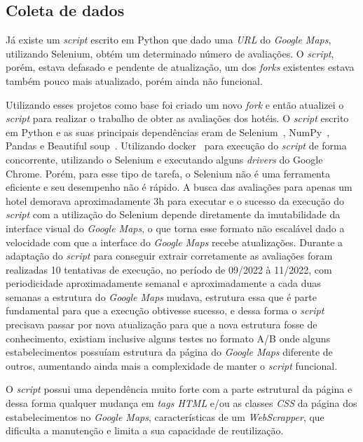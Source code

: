 \subsection{Coleta de dados}
\label{cap:metodologia:sec:conjunto_dados:sec:coleta_review}

Já existe um \emph{script} escrito em Python \cite{gaspa93scrapper2023} que dado uma \emph{URL} do \textit{Google Maps}, utilizando Selenium, obtém um determinado número de avaliações. O \emph{script}, porém, estava defasado e pendente de atualização, um dos \emph{forks} existentes  estava também pouco mais atualizado, porém ainda não funcional.

Utilizando esses projetos como base foi criado um novo \emph{fork} e então atualizei o \emph{script} para realizar o trabalho de obter as avaliações dos hotéis. O \emph{script} escrito em Python e as suas principais dependências eram de Selenium~\cite{selenium2023}, NumPy~\cite{harris2020array}, Pandas\cite{jeffreback20226702671} e Beautiful soup~\cite{richardson2007beautiful}. Utilizando docker~\cite{merkel2014docker} para execução do \emph{script} de forma concorrente, utilizando o Selenium e executando alguns \textit{drivers} do Google Chrome. Porém, para esse tipo de tarefa, o Selenium não é uma ferramenta eficiente e seu desempenho não é rápido. A busca das avaliações para apenas um hotel demorava aproximadamente 3h para executar e o sucesso da execução do \emph{script} com a utilização do Selenium depende diretamente da imutabilidade da interface visual do \textit{Google Maps}, o que torna esse formato não escalável dado a velocidade com que a interface do \textit{Google Maps} recebe atualizações. Durante a adaptação do \emph{script} para conseguir extrair corretamente as avaliações foram realizadas 10 tentativas de execução, no período de 09/2022 à 11/2022, com periodicidade aproximadamente semanal e aproximadamente a cada duas semanas a estrutura do \textit{Google Maps} mudava, estrutura essa que é parte fundamental para que a execução obtivesse sucesso, e dessa forma o \emph{script} precisava passar por nova atualização para que a nova estrutura fosse de conhecimento, existiam inclusive alguns testes no formato A/B onde alguns estabelecimentos possuíam estrutura da página do \textit{Google Maps} diferente de outros, aumentando ainda mais a complexidade de manter o \emph{script} funcional.

O \emph{script} possui uma dependência muito forte com a parte estrutural da página e dessa forma qualquer mudança em \emph{tags HTML} e/ou as classes \emph{CSS} da página dos estabelecimentos no \textit{Google Maps}, características de um \emph{WebScrapper}, que dificulta a manutenção e limita a sua capacidade de reutilização.


